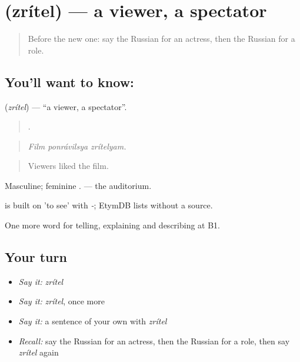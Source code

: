 \section[\texorpdfstring{\ru{зритель} (zrítel)}{зритель (zrítel)}]{ (zrítel) — a viewer, a spectator}

\label{lesson:RU-C520-zritel}



\begin{quote}
Before the new one: say the Russian for an actress, then the Russian for a role.
\end{quote}

\subsection*{You'll want to know: }
\textbf{} (\emph{zrítel}) — \textquotedblleft{}a viewer, a spectator\textquotedblright{}.

\begin{quote}
  .
\end{quote}

\begin{quote}
\emph{Film ponrávilsya zrítelyam.}
\end{quote}

\begin{quote}
Viewers liked the film.
\end{quote}

Masculine; feminine . \emph{ } — the auditorium.

\begin{cousinweb}
\emph{} is built on \emph{} 'to see' with \emph{-}; EtymDB lists \emph{} without a source.
\end{cousinweb}

\begin{grammarlens}[title={What you've built}]
One more word for telling, explaining and describing at B1.
\end{grammarlens}

\subsection*{Your turn}
\begin{itemize}
\raggedright
  \item \emph{Say it:} \emph{zrítel}
  \item \emph{Say it:} \emph{zrítel}, once more
  \item \emph{Say it:} a sentence of your own with \emph{zrítel}
  \item \emph{Recall:} say the Russian for an actress, then the Russian for a role, then say \emph{zrítel} again
\end{itemize}

